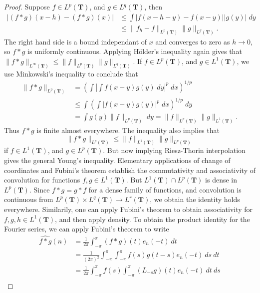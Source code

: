 \begin{proof}
	Suppose $f \in L^p(\mathbf{T})$, and $g \in L^q(\mathbf{T})$, then
	\begin{align*}
		|(f * g)(x - h) - (f * g)(x)| &\leq \int |f(x-h-y) - f(x-y)| |g(y)|\; dy\\
		&\leq \| f_h - f \|_{L^p(\mathbf{T})} \| g \|_{L^q(\mathbf{T})}.
	\end{align*}
	The right hand side is a bound independant of $x$ and converges to zero as $h \to 0$, so $f * g$ is uniformly continuous. Applying H\"{o}lder's inequality again gives that $\| f * g \|_{L^\infty(\mathbf{T})} \leq \| f \|_{L^p(\mathbf{T})} \| g \|_{L^q(\mathbf{T})}$. If $f \in L^p(\mathbf{T})$, and $g \in L^1(\mathbf{T})$, we use Minkowski's inequality to conclude that
	\begin{align*}
		\| f * g \|_{L^p(\mathbf{T})} &= \left( \int \left| \int f(x-y)g(y)\; dy \right|^p\; dx \right)^{1/p}\\
		&\leq \int \left( \int |f(x-y)g(y)|^p\; dx \right)^{1/p}\; dy\\
		&= \int g(y) \| f \|_{L^p(\mathbf{T})}\; dy = \| f \|_{L^p(\mathbf{T})} \| g \|_{L^1(\mathbf{T})}.
	\end{align*}
	Thus $f * g$ is finite almost everywhere. The inequality also implies that
	\[ \| f * g \|_{L^p(\mathbf{T})} \leq \| f \|_{L^1(\mathbf{T})} \| g \|_{L^p(\mathbf{T})} \]
	if $f \in L^1(\mathbf{T})$, and $g \in L^p(\mathbf{T})$. But now implying Riesz-Thorin interpolation gives the general Young's inequality. Elementary applications of change of coordinates and Fubini's theorem establish the commutativity and associativity of convolution for functions $f, g \in L^1(\mathbf{T})$. But $L^1(\mathbf{T}) \cap L^p(\mathbf{T})$ is dense in $L^p(\mathbf{T})$. Since $f * g = g * f$ for a dense family of functions, and convolution is continuous from $L^p(\mathbf{T}) \times L^q(\mathbf{T}) \to L^r(\mathbf{T})$, we obtain the identity holds everywhere. Similarily, one can apply Fubini's theorem to obtain associativity for $f,g,h \in L^1(\mathbf{T})$, and then apply density. To obtain the product identity for the Fourier series, we can apply Fubini's theorem to write
    \begin{align*}
        \widehat{f * g}(n) &= \frac{1}{2\pi} \int_{-\pi}^\pi (f * g)(t) e_n(-t)\ dt\\
        &= \frac{1}{(2\pi)^2} \int_{-\pi}^\pi \int_{-\pi}^\pi f(s)g(t-s) e_n(-t)\ ds\ dt\\
        &= \frac{1}{2 \pi} \int_{-\pi}^\pi f(s) \int_{-\pi}^\pi (L_{-s}g)(t) e_n(-t)\ dt\ ds\\

\end{align*}
\end{proof}

